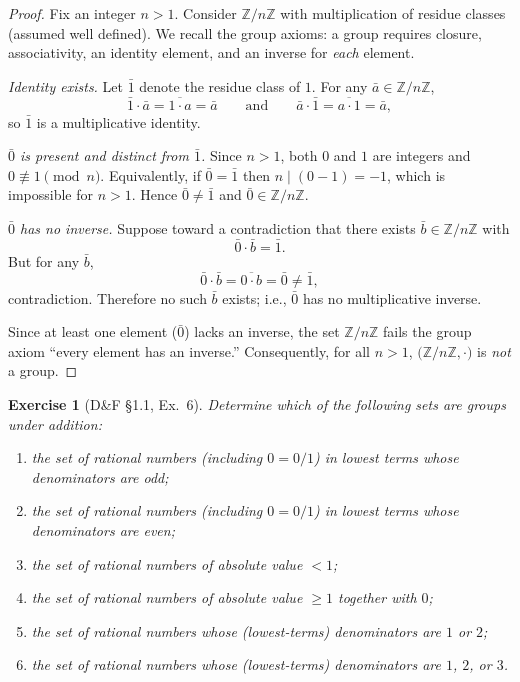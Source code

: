 \documentclass[12pt]{article}
\newtheorem{exercise}[theorem]{Exercise}
\theoremstyle{definition}
\begin{document}
\dotfill

\begin{proof}
Fix an integer $n>1$. Consider $\mathbb{Z}/n\mathbb{Z}$ with multiplication of residue classes (assumed well defined). We recall the group axioms: a group requires closure, associativity, an identity element, and an inverse for \emph{each} element.

\dotfill

\noindent\emph{Identity exists.}
Let $\bar 1$ denote the residue class of $1$. For any $\bar a\in \mathbb{Z}/n\mathbb{Z}$,
\[
\bar 1\cdot \bar a=\overline{1\cdot a}=\bar a
\qquad\text{and}\qquad
\bar a\cdot \bar 1=\overline{a\cdot 1}=\bar a,
\]
so $\bar 1$ is a multiplicative identity.


\noindent\emph{$\bar 0$ is present and distinct from $\bar 1$.}
Since $n>1$, both $0$ and $1$ are integers and $0\not\equiv 1\pmod n$.
Equivalently, if $\bar 0=\bar 1$ then $n\mid (0-1)=-1$, which is impossible for $n>1$.
Hence $\bar 0\neq \bar 1$ and $\bar 0\in \mathbb{Z}/n\mathbb{Z}$.

\dotfill

\noindent\emph{$\bar 0$ has no inverse.}
Suppose toward a contradiction that there exists $\bar b\in\mathbb{Z}/n\mathbb{Z}$ with
\[
\bar 0\cdot \bar b=\bar 1.
\]
But for any $\bar b$,
\[
\bar 0\cdot \bar b=\overline{0\cdot b}=\bar 0\neq \bar 1,
\]
contradiction. Therefore no such $\bar b$ exists; i.e., $\bar 0$ has no multiplicative inverse.

\dotfill

Since at least one element ($\bar 0$) lacks an inverse, the set $\mathbb{Z}/n\mathbb{Z}$ fails the group axiom
“every element has an inverse.” Consequently, for all $n>1$, $\big(\mathbb{Z}/n\mathbb{Z},\cdot\big)$ is \emph{not} a group.
\end{proof}

\newpage

\begin{exercise}[D\&F §1.1, Ex.~6]
Determine which of the following sets are groups under addition:
\begin{enumerate}
\item the set of rational numbers (including $0=0/1$) in lowest terms whose denominators are \emph{odd};
\item the set of rational numbers (including $0=0/1$) in lowest terms whose denominators are \emph{even};
\item the set of rational numbers of absolute value $<1$;
\item the set of rational numbers of absolute value $\ge 1$ together with $0$;
\item the set of rational numbers whose (lowest-terms) denominators are $1$ or $2$;
\item the set of rational numbers whose (lowest-terms) denominators are $1$, $2$, or $3$.
\end{enumerate}
\end{exercise}
\end{document}
